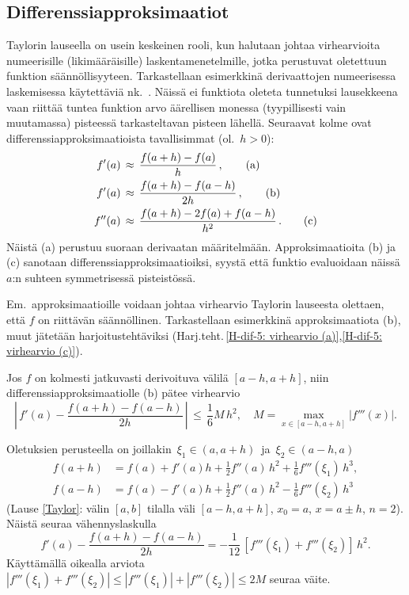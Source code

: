 \subsection*{Differenssiapproksimaatiot}

Taylorin lauseella on usein keskeinen rooli, kun halutaan johtaa virhearvioita numeerisille
(likimääräisille) laskentamenetelmille, jotka perustuvat oletettuun funktion säännöllisyyteen.
Tarkastellaan esimerkkinä derivaattojen numeerisessa laskemisessa käytettäviä nk.\
. Näissä ei funktiota oleteta tunnetuksi lausekkeena vaan
riittää tuntea funktion arvo äärellisen monessa (tyypillisesti vain muutamassa) pisteessä
tarkasteltavan pisteen lähellä. Seuraavat kolme ovat differenssiapproksimaatioista
tavallisimmat (ol.\ $h>0$):
\begin{align}
f'(a)  &\,\approx\, \frac{f(a+h)-f(a)}{h}\,, \label{dif1} \tag{\text{a}} \\
f'(a)  &\,\approx\, \frac{f(a+h)-f(a-h)}{2h}\,, \label{dif2} \tag{\text{b}} \\
f''(a) &\,\approx\, \frac{f(a+h)-2f(a)+f(a-h)}{h^2}\,. \label{dif3} \tag{\text{c}}
\end{align}
Näistä (a) perustuu suoraan derivaatan määritelmään. Approksimaatioita (b) ja (c) sanotaan 
\index{keskeisdifferenssiapproksimaatio}%
differenssiapproksimaatioiksi, syystä että funktio evaluoidaan näissä $a$:n
suhteen symmetrisessä pisteistössä.

Em.\ approksimaatioille voidaan johtaa virhearvio Taylorin lauseesta olettaen, että $f$ on
riittävän säännöllinen. Tarkastellaan esimerkkinä approksimaatiota (b), muut jätetään
harjoitustehtäviksi (Harj.teht.\,\ref{H-dif-5: virhearvio (a)},\ref{H-dif-5: virhearvio (c)}).
\begin{Prop} \label{keskeisdifferenssin tarkkuus} Jos $f$ on kolmesti jatkuvasti derivoituva
välilä $[a-h,a+h]$, niin differenssiapproksimaatiolle (b) pätee virhearvio
\[
\left|\,f'(a)-\frac{f(a+h)-f(a-h)}{2h}\,\right| \,\le\,\frac{1}{6}M\,h^2, \quad
                                          M=\max_{x\in[a-h,a+h]}|f'''(x)|.
\]
\end{Prop}
\tod Oletuksien perusteella on joillakin $\,\xi_1\in(a,a+h)\,$ ja $\,\xi_2\in(a-h,a)$ 
\begin{align*}
f(a+h) &= f(a)+f'(a)h+\frac{1}{2}f''(a)\,h^2+\frac{1}{6}f'''(\xi_1)\,h^3, \\
f(a-h) &= f(a)-f'(a)h+\frac{1}{2}f''(a)\,h^2-\frac{1}{6}f'''(\xi_2)\,h^3
\end{align*}
(Lause \ref{Taylor}: välin $[a,b]$ tilalla väli $[a-h,a+h]$, $x_0=a$, $x=a \pm h$, $n=2$).
Näistä seuraa vähennyslaskulla
\[
f'(a)-\frac{f(a+h)-f(a-h)}{2h} = -\frac{1}{12}\,[f'''(\xi_1)+f'''(\xi_2)]\,h^2.
\]
Käyttämällä oikealla arviota $|f'''(\xi_1)+f'''(\xi_2)| \le |f'''(\xi_1)|+|f'''(\xi_2)| \le 2M$
seuraa väite. \loppu

